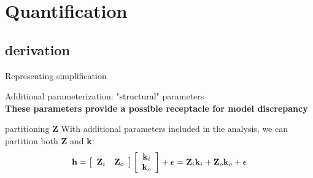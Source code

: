 \documentclass{beamer}
\begin{document}
%
%



\section{Quantification}
\subsection{derivation}

\begin{frame}{Representing simplification}

Additional parameterization: "structural" parameters\\
\textbf{These parameters provide a possible receptacle for model discrepancy}
\end{frame}

\begin{frame}{partitioning \textbf{Z}}
With additional parameters included in the analysis, we can partition both \textbf{Z} and \textbf{k}:
\begin{equation*} 
{\bf h} =  \left[ \begin{array}{cc}{\bf Z}_i&{\bf Z}_o\end{array}\right]
		\left[ \begin{array}{c}{\bf k}_i\\{\bf k}_o\end{array}\right]
		+ {\boldsymbol \epsilon}
		= {\bf Z}_i\textbf{k}_i + \textbf{Z}_o\textbf{k}_o + {\boldsymbol \epsilon}
\end{equation*}
\end{frame}
\end{document}

